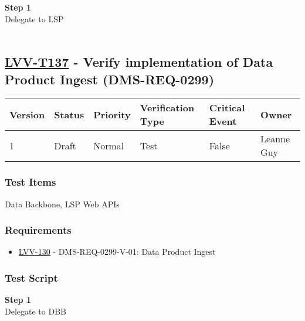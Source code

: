 \textbf{Step 1}\\
Delegate to LSP\\
~\\

\hypertarget{lvv-t137---verify-implementation-of-data-product-ingest-dms-req-0299}{%
\subsection{\texorpdfstring{\href{https://jira.lsstcorp.org/secure/Tests.jspa\#/testCase/LVV-T137}{LVV-T137}
- Verify implementation of Data Product Ingest
(DMS-REQ-0299)}{LVV-T137 - Verify implementation of Data Product Ingest (DMS-REQ-0299)}}\label{lvv-t137---verify-implementation-of-data-product-ingest-dms-req-0299}}

\begin{longtable}[]{@{}llllll@{}}
\toprule
Version & Status & Priority & Verification Type & Critical Event &
Owner\tabularnewline
\midrule
\endhead
1 & Draft & Normal & Test & False & Leanne Guy\tabularnewline
\bottomrule
\end{longtable}

\hypertarget{test-items-113}{%
\subsubsection{Test Items}\label{test-items-113}}

Data Backbone, LSP Web APIs~

\hypertarget{requirements-114}{%
\subsubsection{Requirements}\label{requirements-114}}

\begin{itemize}
\tightlist
\item
  \href{https://jira.lsstcorp.org/browse/LVV-130}{LVV-130} -
  DMS-REQ-0299-V-01: Data Product Ingest
\end{itemize}

\hypertarget{test-script-114}{%
\subsubsection{Test Script}\label{test-script-114}}

\textbf{Step 1}\\
Delegate to DBB\\
~\\


